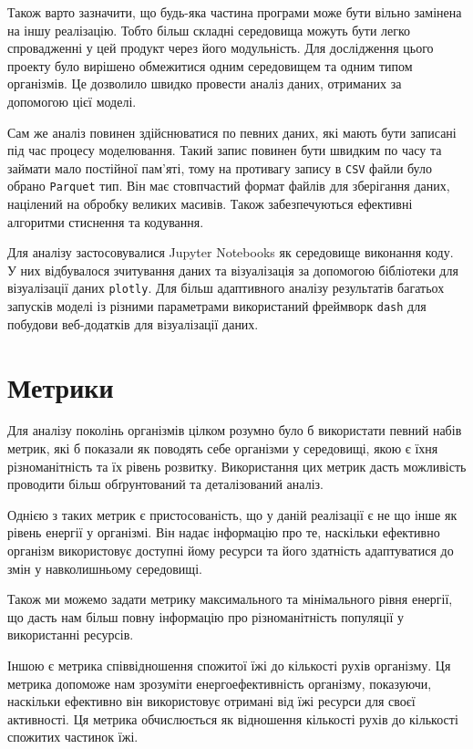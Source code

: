 Також варто зазначити, що будь-яка частина програми може 
бути вільно замінена на іншу реалізацію. 
Тобто більш складні середовища можуть бути легко спровадженні у 
цей продукт через його модульність. 
Для дослідження цього проекту було вирішено обмежитися 
одним середовищем та одним типом організмів. 
Це дозволило швидко провести аналіз даних, отриманих за допомогою цієї моделі.

Сам же аналіз повинен здійснюватися по певних даних, які мають бути записані
під час процесу моделювання.
Такий запис повинен бути швидким по часу та займати мало постійної пам'яті,
тому на противагу запису в \verb+CSV+ файли було обрано \verb+Parquet+ тип.
Він має стовпчастий формат файлів для зберігання даних, націлений на обробку
великих масивів. Також забезпечуються ефективні алгоритми стиснення та кодування.

Для аналізу застосовувалися Jupyter Notebooks як середовище виконання коду.
У них відбувалося зчитування даних та візуалізація за допомогою 
бібліотеки для візуалізації даних \verb+plotly+.
Для більш адаптивного аналізу результатів багатьох запусків моделі із
різними параметрами використаний фреймворк \verb+dash+ 
для побудови веб-додатків для візуалізації даних.



\section{Метрики}

Для аналізу поколінь організмів цілком розумно було б 
використати певний набів метрик, які б показали як 
поводять себе організми у середовищі, якою є їхня 
різноманітність та їх рівень розвитку. 
Використання цих метрик дасть можливість проводити більш 
обґрунтований та деталізований аналіз.

Однією з таких метрик є пристосованість, 
що у даній реалізації є не що інше як рівень енергії у організмі. 
Він надає інформацію про те, наскільки ефективно організм 
використовує доступні йому ресурси та його здатність 
адаптуватися до змін у навколишньому середовищі.

Також ми можемо задати метрику максимального та 
мінімального рівня енергії, що дасть нам більш повну 
інформацію про різноманітність популяції у використанні ресурсів.

Іншою є метрика співвідношення спожитої їжі до кількості 
рухів організму. 
Ця метрика допоможе нам зрозуміти енергоефективність організму, 
показуючи, наскільки ефективно він використовує отримані 
від їжі ресурси для своєї активності. 
Ця метрика обчислюється як відношення 
кількості рухів до кількості спожитих частинок їжі.



